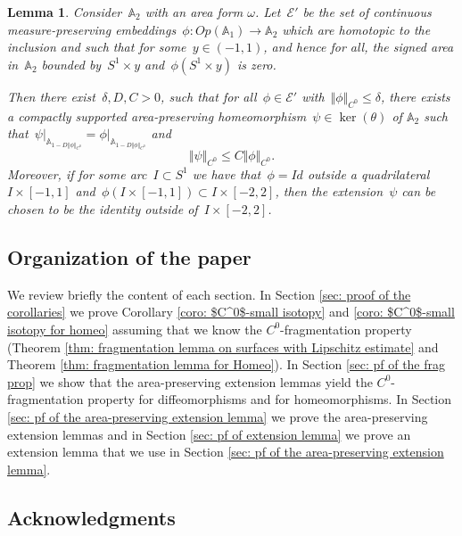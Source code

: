 \documentclass[10pt]{amsart}
\newtheorem{lemma}[prop]{Lemma}
\begin{document}
\begin{lemma}\label{lem: area-preserving extension lemma for homeo}
	Consider~$\mathbb{A}_2$ with an area form $\omega$. Let~$\mathcal{E}'$ be the set of continuous measure-preserving embeddings~$\phi: Op(\mathbb{A}_1)\rightarrow \mathbb{A}_2$ which are homotopic to the inclusion and such that for some~$y\in (-1,1)$, and hence for all, the signed area in~$\mathbb{A}_2$ bounded by~$S^1\times y$ and~$\phi(S^1 \times y)$ is zero.
	
	Then there exist~$\delta, D , C>0$, such that for all~$\phi \in \mathcal{E}'$ with~$\Vert\phi \Vert_{C^0}\leq \delta$, there exists a compactly supported area-preserving homeomorphism~$\psi \in \ker(\theta)$ of $\mathbb A_2$ such that~$\psi \vert_{\mathbb{A}_{1-D\Vert\phi \Vert_{C^0}}}=\phi\vert_{\mathbb{A}_{1-D\Vert\phi \Vert_{C^0}}}$ and 
	$$\Vert \psi \Vert_{C^0}\leq C \Vert\phi \Vert_{C^0}.$$
	Moreover, if for some arc~$I\subset S^1$ we have that~$\phi=Id$ outside a quadrilateral~$I\times[-1,1]$ and~$\phi(I\times [-1,1])\subset I\times [-2,2]$, then the extension~$\psi$ can be chosen to be the identity outside of~$I\times [-2,2]$.
\end{lemma}


\subsection{Organization of the paper}\label{subsec: Organization}

We review briefly the content of each section. In Section \ref{sec: proof of the corollaries} we prove Corollary \ref{coro: $C^0$-small isotopy} and \ref{coro: $C^0$-small isotopy for homeo} assuming that we know the $C^0$-fragmentation property (Theorem \ref{thm: fragmentation lemma on surfaces with Lipschitz estimate} and Theorem \ref{thm: fragmentation lemma for Homeo}). In Section \ref{sec: pf of the frag prop} we show that the area-preserving extension lemmas yield the $C^0$-fragmentation property for diffeomorphisms and for homeomorphisms. In Section \ref{sec: pf of the area-preserving extension lemma} we prove the area-preserving extension lemmas and in Section \ref{sec: pf of extension lemma} we prove an extension lemma that we use in Section \ref{sec: pf of the area-preserving extension lemma}.


\subsection{Acknowledgments}\label{subsec: acknowledgments}
\end{document}
